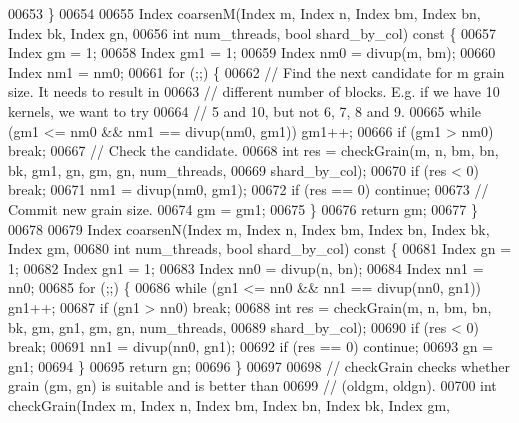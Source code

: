 \begin{DoxyCode}
00653   \}
00654 
00655   Index coarsenM(Index m, Index n, Index bm, Index bn, Index bk, Index gn,
00656                  \textcolor{keywordtype}{int} num\_threads, \textcolor{keywordtype}{bool} shard\_by\_col)\textcolor{keyword}{ const }\{
00657     Index gm = 1;
00658     Index gm1 = 1;
00659     Index nm0 = divup(m, bm);
00660     Index nm1 = nm0;
00661     \textcolor{keywordflow}{for} (;;) \{
00662       \textcolor{comment}{// Find the next candidate for m grain size. It needs to result in}
00663       \textcolor{comment}{// different number of blocks. E.g. if we have 10 kernels, we want to try}
00664       \textcolor{comment}{// 5 and 10, but not 6, 7, 8 and 9.}
00665       \textcolor{keywordflow}{while} (gm1 <= nm0 && nm1 == divup(nm0, gm1)) gm1++;
00666       \textcolor{keywordflow}{if} (gm1 > nm0) \textcolor{keywordflow}{break};
00667       \textcolor{comment}{// Check the candidate.}
00668       \textcolor{keywordtype}{int} res = checkGrain(m, n, bm, bn, bk, gm1, gn, gm, gn, num\_threads,
00669                            shard\_by\_col);
00670       \textcolor{keywordflow}{if} (res < 0) \textcolor{keywordflow}{break};
00671       nm1 = divup(nm0, gm1);
00672       \textcolor{keywordflow}{if} (res == 0) \textcolor{keywordflow}{continue};
00673       \textcolor{comment}{// Commit new grain size.}
00674       gm = gm1;
00675     \}
00676     \textcolor{keywordflow}{return} gm;
00677   \}
00678 
00679   Index coarsenN(Index m, Index n, Index bm, Index bn, Index bk, Index gm,
00680                  \textcolor{keywordtype}{int} num\_threads, \textcolor{keywordtype}{bool} shard\_by\_col)\textcolor{keyword}{ const }\{
00681     Index gn = 1;
00682     Index gn1 = 1;
00683     Index nn0 = divup(n, bn);
00684     Index nn1 = nn0;
00685     \textcolor{keywordflow}{for} (;;) \{
00686       \textcolor{keywordflow}{while} (gn1 <= nn0 && nn1 == divup(nn0, gn1)) gn1++;
00687       \textcolor{keywordflow}{if} (gn1 > nn0) \textcolor{keywordflow}{break};
00688       \textcolor{keywordtype}{int} res = checkGrain(m, n, bm, bn, bk, gm, gn1, gm, gn, num\_threads,
00689                            shard\_by\_col);
00690       \textcolor{keywordflow}{if} (res < 0) \textcolor{keywordflow}{break};
00691       nn1 = divup(nn0, gn1);
00692       \textcolor{keywordflow}{if} (res == 0) \textcolor{keywordflow}{continue};
00693       gn = gn1;
00694     \}
00695     \textcolor{keywordflow}{return} gn;
00696   \}
00697 
00698   \textcolor{comment}{// checkGrain checks whether grain (gm, gn) is suitable and is better than}
00699   \textcolor{comment}{// (oldgm, oldgn).}
00700   \textcolor{keywordtype}{int} checkGrain(Index m, Index n, Index bm, Index bn, Index bk, Index gm,

\end{DoxyCode}

